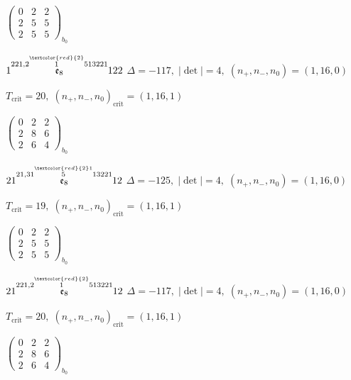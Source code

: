 \documentclass[10pt]{article}
\begin{document}
\hspace{2em}$\left(\begin{smallmatrix}0 & 2 & 2 \\ 2 & 5 & 5 \\ 2 & 5 & 5\end{smallmatrix}\right)_{\!b_0}$

\smallskip

$1\overset{221,2\overset{\textcolor{red}{2}}{1}513221}{\mathfrak{e}_8}122$ \quad $\Delta=-117,\; |\det|=4,\; (n_+,n_-,n_0)=(1,16,0)$

\hspace{1em}$T_{\text{crit}}=20,\; (n_+,n_-,n_0)_{\text{crit}}=(1,16,1)$

\hspace{2em}$\left(\begin{smallmatrix}0 & 2 & 2 \\ 2 & 8 & 6 \\ 2 & 6 & 4\end{smallmatrix}\right)_{\!b_0}$

\smallskip

$21\overset{21,31\overset{\textcolor{red}{2}1}{5}13221}{\mathfrak{e}_8}12$ \quad $\Delta=-125,\; |\det|=4,\; (n_+,n_-,n_0)=(1,16,0)$

\hspace{1em}$T_{\text{crit}}=19,\; (n_+,n_-,n_0)_{\text{crit}}=(1,16,1)$

\hspace{2em}$\left(\begin{smallmatrix}0 & 2 & 2 \\ 2 & 5 & 5 \\ 2 & 5 & 5\end{smallmatrix}\right)_{\!b_0}$

\smallskip

$21\overset{221,2\overset{\textcolor{red}{2}}{1}513221}{\mathfrak{e}_8}12$ \quad $\Delta=-117,\; |\det|=4,\; (n_+,n_-,n_0)=(1,16,0)$

\hspace{1em}$T_{\text{crit}}=20,\; (n_+,n_-,n_0)_{\text{crit}}=(1,16,1)$

\hspace{2em}$\left(\begin{smallmatrix}0 & 2 & 2 \\ 2 & 8 & 6 \\ 2 & 6 & 4\end{smallmatrix}\right)_{\!b_0}$
\end{document}
